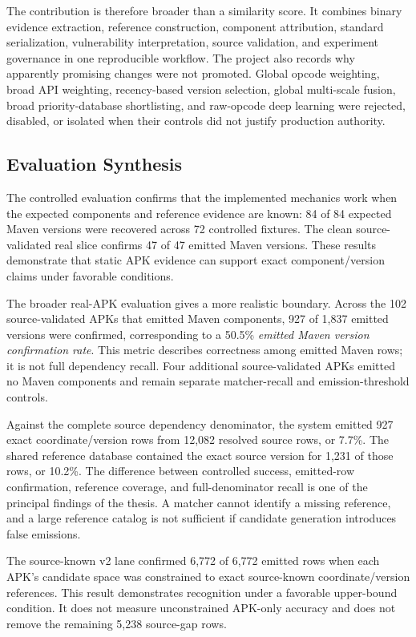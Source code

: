 The contribution is therefore broader than a similarity score. It combines
binary evidence extraction, reference construction, component attribution,
standard serialization, vulnerability interpretation, source validation, and
experiment governance in one reproducible workflow. The project also records
why apparently promising changes were not promoted. Global opcode weighting,
broad API weighting, recency-based version selection, global multi-scale
fusion, broad priority-database shortlisting, and raw-opcode deep learning
were rejected, disabled, or isolated when their controls did not justify
production authority.

\subsection{Evaluation Synthesis}

The controlled evaluation confirms that the implemented mechanics work when
the expected components and reference evidence are known: 84 of 84 expected
Maven versions were recovered across 72 controlled fixtures. The clean
source-validated real slice confirms 47 of 47 emitted Maven versions. These
results demonstrate that static APK evidence can support exact
component/version claims under favorable conditions.

The broader real-APK evaluation gives a more realistic boundary. Across the
102 source-validated APKs that emitted Maven components, 927 of 1,837 emitted
versions were confirmed, corresponding to a 50.5\% \emph{emitted Maven
version confirmation rate}. This metric describes correctness among emitted
Maven rows; it is not full dependency recall. Four additional source-validated
APKs emitted no Maven components and remain separate matcher-recall and
emission-threshold controls.

Against the complete source dependency denominator, the system emitted 927
exact coordinate/version rows from 12,082 resolved source rows, or 7.7\%.
The shared reference database contained the exact source version for 1,231 of
those rows, or 10.2\%. The difference between controlled success, emitted-row
confirmation, reference coverage, and full-denominator recall is one of the
principal findings of the thesis. A matcher cannot identify a missing
reference, and a large reference catalog is not sufficient if candidate
generation introduces false emissions.

The source-known v2 lane confirmed 6,772 of 6,772 emitted rows when each APK's
candidate space was constrained to exact source-known coordinate/version
references. This result demonstrates recognition under a favorable
upper-bound condition. It does not measure unconstrained APK-only accuracy and
does not remove the remaining 5,238 source-gap rows.

